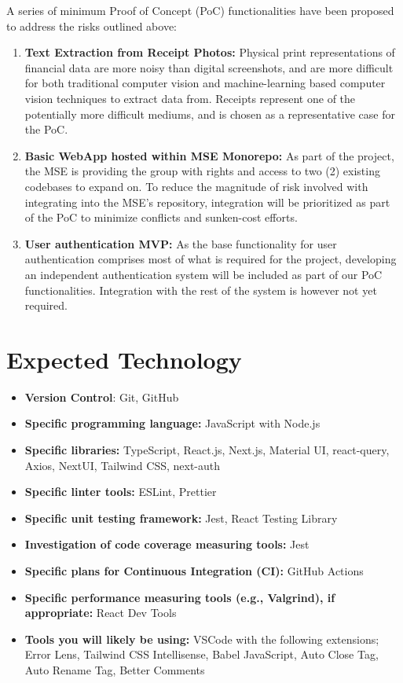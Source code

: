 \documentclass{article}
\begin{document}
A series of minimum Proof of Concept (PoC) functionalities have been proposed to address the risks outlined above:
\begin {enumerate}
  \item \textbf{Text Extraction from Receipt Photos:} Physical print representations of financial data are more noisy than digital screenshots, and are more difficult
  for both traditional computer vision and machine-learning based computer vision techniques to extract data from. Receipts represent one of the potentially more
  difficult mediums, and is chosen as a representative case for the PoC.
  \item \textbf{Basic WebApp hosted within MSE Monorepo:} As part of the project, the MSE is providing the group with rights and access to two (2) existing codebases to
  expand on. To reduce the magnitude of risk involved with integrating into the MSE's repository, integration will be prioritized as part of the PoC to minimize conflicts and
  sunken-cost efforts.
  \item \textbf{User authentication MVP:} As the base functionality for user authentication comprises most of what is required for the project, developing an independent
  authentication system will be included as part of our PoC functionalities. Integration with the rest of the system is however not yet required.
\end {enumerate}


\section{Expected Technology}

\begin{itemize}
  \item \textbf{Version Control}: Git, GitHub
  \item \textbf{Specific programming language:} JavaScript with Node.js
  \item \textbf{Specific libraries:} TypeScript, React.js, Next.js, Material UI, react-query, Axios, NextUI, Tailwind CSS, next-auth
  \item \textbf{Specific linter tools:} ESLint, Prettier
  \item \textbf{Specific unit testing framework:} Jest, React Testing Library
  \item \textbf{Investigation of code coverage measuring tools:} Jest
  \item \textbf{Specific plans for Continuous Integration (CI):} GitHub Actions
  \item \textbf{Specific performance measuring tools (e.g., Valgrind), if appropriate:} React Dev Tools
  \item \textbf{Tools you will likely be using:} VSCode with the following extensions; Error Lens, Tailwind CSS Intellisense, Babel JavaScript, Auto Close Tag, Auto Rename Tag, Better Comments
\end{itemize}
\end{document}
